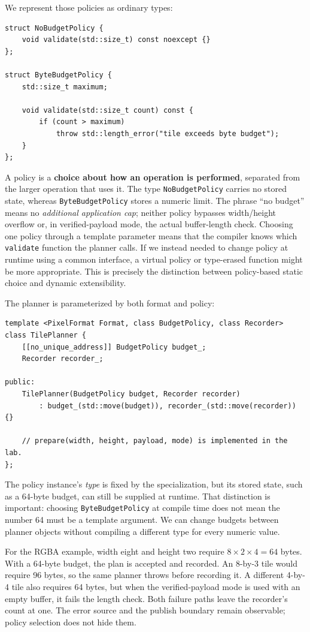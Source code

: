 We represent those policies as ordinary types:

\begin{verbatim}
struct NoBudgetPolicy {
    void validate(std::size_t) const noexcept {}
};

struct ByteBudgetPolicy {
    std::size_t maximum;

    void validate(std::size_t count) const {
        if (count > maximum)
            throw std::length_error("tile exceeds byte budget");
    }
};
\end{verbatim}

A policy is a \textbf{choice about how an operation is performed}, separated from the larger operation that uses it. The type \texttt{NoBudgetPolicy} carries no stored state, whereas \texttt{ByteBudgetPolicy} stores a numeric limit. The phrase ``no budget'' means no \emph{additional application cap}; neither policy bypasses width/height overflow or, in verified-payload mode, the actual buffer-length check. Choosing one policy through a template parameter means that the compiler knows which \texttt{validate} function the planner calls. If we instead needed to change policy at runtime using a common interface, a virtual policy or type-erased function might be more appropriate. This is precisely the distinction between policy-based static choice and dynamic extensibility.

The planner is parameterized by both format and policy:

\begin{verbatim}
template <PixelFormat Format, class BudgetPolicy, class Recorder>
class TilePlanner {
    [[no_unique_address]] BudgetPolicy budget_;
    Recorder recorder_;

public:
    TilePlanner(BudgetPolicy budget, Recorder recorder)
        : budget_(std::move(budget)), recorder_(std::move(recorder)) {}

    // prepare(width, height, payload, mode) is implemented in the lab.
};
\end{verbatim}

The policy instance's \emph{type} is fixed by the specialization, but its stored state, such as a 64-byte budget, can still be supplied at runtime. That distinction is important: choosing \texttt{ByteBudgetPolicy} at compile time does not mean the number 64 must be a template argument. We can change budgets between planner objects without compiling a different type for every numeric value.

For the RGBA example, width eight and height two require \(8\times2\times4=64\) bytes. With a 64-byte budget, the plan is accepted and recorded. An 8-by-3 tile would require 96 bytes, so the same planner throws before recording it. A different 4-by-4 tile also requires 64 bytes, but when the verified-payload mode is used with an empty buffer, it fails the length check. Both failure paths leave the recorder's count at one. The error source and the publish boundary remain observable; policy selection does not hide them.

